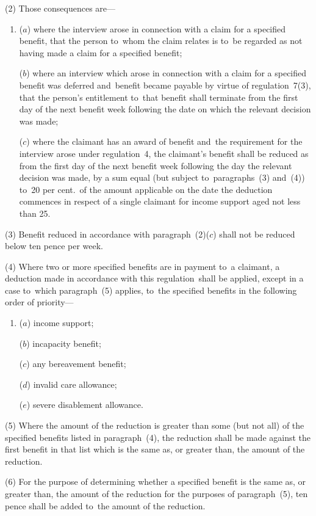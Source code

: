 \documentclass[12pt,a4paper]{article}
\begin{document}
(2) Those consequences are—
\begin{enumerate}\item[]
($a$) where the interview arose in connection with a claim for a specified benefit, that the person to~whom the claim relates is to~be regarded as not having made a claim for a specified benefit;

\enlargethispage{-\baselineskip}

($b$) where an interview which arose in connection with a claim for a specified benefit was deferred and~benefit became payable by virtue of regulation~7(3), that the person’s entitlement to~that benefit shall terminate from the first day of the next benefit week following the date on which the relevant decision was made;

($c$) where the claimant has an award of benefit and~the requirement for the interview arose under regulation~4, the claimant’s benefit shall be reduced as from the first day of the next benefit week following the day the relevant decision was made, by a sum equal (but subject to~paragraphs~(3) and~(4)) to~20 per cent.\ of the amount applicable on the date the deduction commences in respect of a single claimant for income support aged not less than 25.
\end{enumerate}

(3) Benefit reduced in accordance with paragraph~(2)($c$)  shall not be reduced below ten pence per week.

(4) Where two or more specified benefits are in payment to~a claimant, a deduction made in accordance with this regulation~shall be applied, except in a case to~which paragraph~(5) applies, to~the specified benefits in the following order of priority—
\begin{enumerate}\item[]
($a$) income support;

($b$) incapacity benefit;

($c$) any bereavement benefit;

($d$) invalid care allowance;

($e$) severe disablement allowance.
\end{enumerate}

(5) Where the amount of the reduction is greater than some (but not all) of the specified benefits listed in paragraph~(4), the reduction shall be made against the first benefit in that list which is the same as, or greater than, the amount of the reduction.

(6) For the purpose of determining whether a specified benefit is the same as, or greater than, the amount of the reduction for the purposes of paragraph~(5), ten pence shall be added to~the amount of the reduction.
\end{document}
